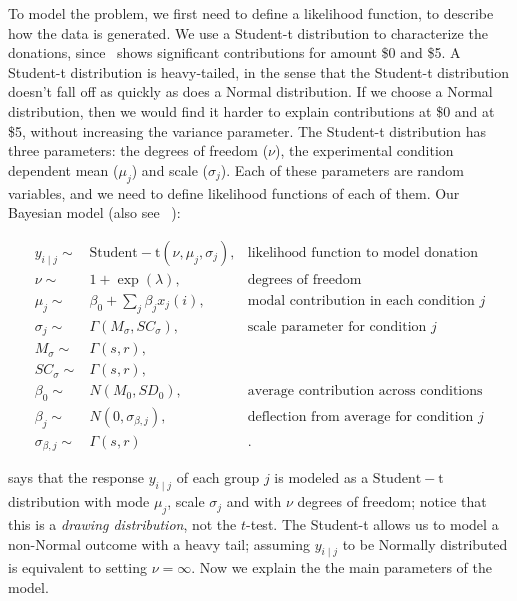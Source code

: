 To model the problem, we first need to define a likelihood function, to describe how the data is generated. We use a Student-t distribution to characterize the donations, since~ shows significant contributions for amount \$0 and \$5. A Student-t distribution is heavy-tailed, in the sense that the Student-t distribution doesn't fall off as quickly as does a Normal distribution. If we choose a Normal distribution, then we would find it harder to explain contributions at \$0 and at \$5, without increasing the variance parameter. The Student-t distribution has three parameters: the degrees of freedom ($\nu$), the experimental condition dependent mean ($\mu_j$) and scale ($\sigma_j$). Each of these parameters are random variables, and we need to define likelihood functions of each of them. Our Bayesian model (also see~ ):


\begin{align}
    y_{i \mid j} \sim &  \mathrm{Student-t}(\nu, \mu_j, \sigma_j),  & \text{likelihood function to model donation}\label{eq:bayesian formulation}\\
    \nu \sim & 1 + \exp(\lambda), & \text{degrees of freedom}\\
    \mu_j \sim & \beta_0 + \sum_j \beta_j x_j(i), & \text{modal contribution in each condition } j\label{eq:mean response}\\
    \sigma_j \sim & \Gamma(M_{\sigma}, SC_{\sigma}), & \text{scale parameter for condition } j\\
    M_{\sigma} \sim & \Gamma(s,r), & \\
    SC_{\sigma} \sim & \Gamma(s,r), &  \\
    \beta_0 \sim & N(M_0, SD_0), & \text{average contribution across conditions}\\
    \beta_j \sim & N (0, \sigma_{\beta, j}), & \text{deflection from average for condition } j\\
    \sigma_{\beta, j} \sim & \Gamma(s,r) & .
\end{align}
 
 says that the response $y_{i \mid j}$ of each group $j$ is modeled as a $\mathrm{Student-t}$ distribution with mode $\mu_j$,  scale $\sigma_j$ and with $\nu$ degrees of freedom; notice that this is a \textit{drawing distribution}, not the $t$-test. The Student-t allows us to model a non-Normal outcome with a heavy tail; assuming $y_{i \mid j}$ to be Normally distributed is equivalent to setting $\nu=\infty$. Now we explain the the main parameters of the model.


